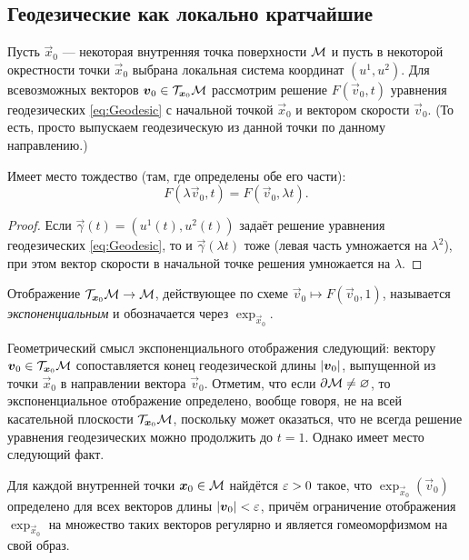 \subsection{Геодезические как локально кратчайшие}

Пусть $\vec{x}_0$ --- некоторая внутренняя точка поверхности $\mathcal{M}$ и пусть в некоторой окрестности точки $\vec{x}_0$ выбрана локальная система координат $(u^1, u^2)$. Для всевозможных векторов $\boldsymbol{v}_0 \in \mathcal{T}_{\boldsymbol{x}_0}\mathcal{M}$ рассмотрим решение $F(\vec{v}_0, t)$ уравнения геодезических \eqref{eq:Geodesic} с начальной точкой $\vec{x}_0$ и вектором скорости $\vec{v}_0$. (То есть, просто выпускаем геодезическую из данной точки по данному направлению.)

\begin{proposition}
	Имеет место тождество (там, где определены обе его части):
	\[
		F(\lambda\vec{v}_0, t) = F(\vec{v}_0, \lambda t).
	\]
\end{proposition}

\begin{proof}
	Если $\vec{\gamma}(t) = (u^1(t), u^2(t))$ задаёт решение уравнения геодезических \eqref{eq:Geodesic}, то и $\vec{\gamma}(\lambda t)$ тоже (левая часть умножается на $\lambda^2$), при этом вектор скорости в начальной точке решения умножается на $\lambda$.
\end{proof}

\begin{definition}
	Отображение $\mathcal{T}_{\boldsymbol{x}_0}\mathcal{M} \to \mathcal{M}$, действующее по схеме $\vec{v}_0 \mapsto F(\vec{v}_0, 1)$, называется \textit{экспоненциальным} и обозначается через $\exp_{\vec{x}_0}$.
\end{definition}

Геометрический смысл экспоненциального отображения следующий: вектору $\boldsymbol{v}_0 \in \mathcal{T}_{\boldsymbol{x}_0}\mathcal{M}$ сопоставляется конец геодезической длины $\left\lvert\boldsymbol{v}_0\right\rvert$, выпущенной из точки $\vec{x}_0$ в направлении вектора $\vec{v}_0$. Отметим, что если $\partial\mathcal{M} \ne \varnothing$, то экспоненциальное отображение определено, вообще говоря, не на всей касательной плоскости $\mathcal{T}_{\boldsymbol{x}_0}\mathcal{M}$, поскольку может оказаться, что не всегда решение уравнения геодезических можно продолжить до $t = 1$. Однако имеет место следующий факт.

\begin{theorem}
	Для каждой внутренней точки $\boldsymbol{x}_0 \in \mathcal{M}$ найдётся $\varepsilon > 0$ такое, что $\exp_{\vec{x}_0}(\vec{v}_0)$ определено для всех векторов длины $\left\lvert\boldsymbol{v}_0\right\rvert < \varepsilon$, причём ограничение отображения $\exp_{\vec{x}_0}$ на множество таких векторов регулярно и является гомеоморфизмом на свой образ.
\end{theorem}

